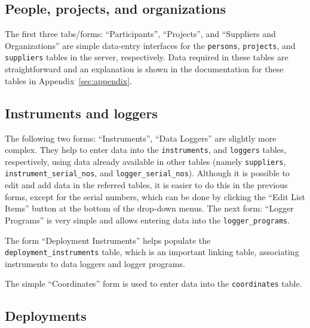 \documentclass[12pt,letterpaper,titlepage,headings=small,numbers=noenddot]%
{scrartcl}
\begin{document}
\subsection{People, projects, and organizations}
\label{sec:people-projs-orgs}

The first three tabs/forms: ``Participants'', ``Projects'', and ``Suppliers
and Organizations'' are simple data-entry interfaces for the
\texttt{persons}, \texttt{projects}, and \texttt{suppliers} tables in the
server, respectively.  Data required in these tables are straightforward
and an explanation is shown in the documentation for these tables in
Appendix~\ref{sec:appendix}.

\subsection{Instruments and loggers}
\label{sec:instruments-loggers}

The following two forms: ``Instruments'', ``Data Loggers'' are slightly
more complex.  They help to enter data into the \texttt{instruments}, and
\texttt{loggers} tables, respectively, using data already available in
other tables (namely \texttt{suppliers}, \texttt{instrument\_serial\_nos},
and \texttt{logger\_serial\_nos}).  Although it is possible to edit and add
data in the referred tables, it is easier to do this in the previous forms,
except for the serial numbers, which can be done by clicking the ``Edit
List Items'' button at the bottom of the drop-down menus.  The next form:
``Logger Programs'' is very simple and allows entering data into the
\texttt{logger\_programs}.

The form ``Deployment Instruments'' helps populate the
\texttt{deployment\_instruments} table, which is an important linking
table, associating instruments to data loggers and logger programs.

The simple ``Coordinates'' form is used to enter data into the
\texttt{coordinates} table.

\subsection{Deployments}
\label{sec:deployments}
\end{document}
